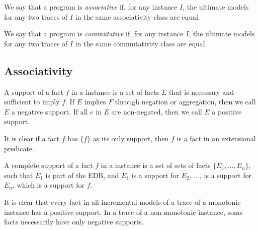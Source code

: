 \begin{definition}
%
We say that a \lang program is {\em associative} if, for any instance $I$,  the
ultimate models for any two traces of $I$ in the same associativity class are
equal.
%
\end{definition}

\begin{definition}
%
We say that a \lang program is {\em commutative} if, for any instance $I$, the
ultimate models for any two traces of $I$ in the same commutativity class are
equal.
%
\end{definition}


\subsection{Associativity}

%
%

\begin{definition}
%
A support of a fact $f$ in a \lang instance is a set of facts $E$ that is
necessary and sufficient to imply $f$.  If $E$ implies $F$ through negation or
aggregation, then we call $E$ a negative support.  If all $e$ in $E$ are
non-negated, then we call $E$ a positive support.
%
\end{definition}

It is clear if a fact $f$ has $\{f\}$ as its only support, then $f$ is a fact
in an extensional predicate.

\begin{definition}
%
A complete support of a fact $f$ in a \lang instance is a set of sets of facts
$\{E_1, ..., E_n\}$, such that $E_1$ is part of the EDB, and $E_1$ is a support
for $E_2$, ..., is a support for $E_n$, which is a support for $f$.
%
\end{definition}

It is clear that every fact in all incremental models of a trace of a monotonic
\lang instance has a positive support.  In a trace of a non-monotonic \lang
instance, some facts necessarily have only negative supports.

